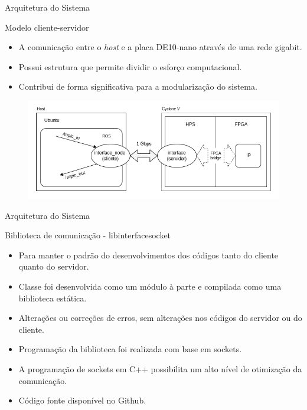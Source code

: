\documentclass[10pt]{beamer}
\begin{document}
\begin{frame}{Arquitetura do Sistema}
    \begin{alertblock}{Modelo cliente-servidor}
		\vspace{0.2cm}
		\begin{itemize}
			\item A comunicação entre o \textit{host} e a placa DE10-nano através de uma rede gigabit.
			\item Possui estrutura que permite dividir o esforço computacional.
			\item Contribui de forma significativa para a modularização do sistema.
		\end{itemize}
		\begin{figure}[h]
			\begin{center}
				\includegraphics[scale=0.42]{imagens/arquitetura_geral.png}\\
			\end{center}
			\label{fig:arquitetura}
		\end{figure}
	\end{alertblock}
\end{frame}


\begin{frame}{Arquitetura do Sistema}
	\begin{alertblock}{Biblioteca de comunicação - libinterfacesocket}
		\vspace{0.2cm}
	    \begin{itemize}
			\setlength\itemsep{0.7em}
	        \item Para manter o padrão do desenvolvimentos dos códigos tanto do cliente quanto do servidor.
	        \item Classe foi desenvolvida como um módulo à parte e compilada como uma biblioteca estática.
	        \item Alterações ou correções de erros, sem alterações nos códigos do servidor ou do cliente.
	        \item Programação da biblioteca foi realizada com base em sockets.
	        \item A programação de sockets em C++ possibilita um alto nível de otimização da comunicação.
	        \item Código fonte disponível no Github.
	    \end{itemize}
	\end{alertblock}
\end{frame}
\end{document}
